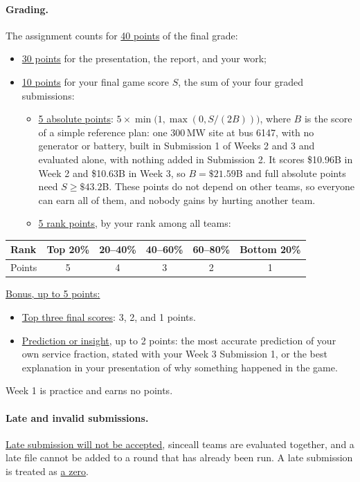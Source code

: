 \documentclass[10pt]{article}
\newcommand{\alert}[1]{{\color{alertblue}\uline{#1}}}
\newcommand{\MW}{\ensuremath{\,\mathrm{MW}}}
\begin{document}
\paragraph{Grading.} The assignment counts for \alert{40 points} of the final
grade:
\begin{itemize}[leftmargin=*]
  \item \alert{30 points} for the presentation, the report, and your work;
  \item \alert{10 points} for your final game score $S$, the sum of your four
    graded submissions:
    \begin{itemize}
      \item \alert{5 absolute points}: $5 \times \min\!\big(1, \max(0, S/(2B))\big)$,
        where $B$ is the score of a simple reference plan: one 300\MW{} site
        at bus 6147, with no generator or battery, built in Submission 1 of
        Weeks 2 and 3 and evaluated alone, with nothing added in Submission 2.
        It scores \$10.96B in Week 2 and \$10.63B in Week 3, so
        $B = \$21.59$B and full absolute points need $S \ge \$43.2$B.
        These points do not depend on other teams, so everyone can earn all
        of them, and nobody gains by hurting another team.
      \item \alert{5 rank points}, by your rank among all teams:
    \end{itemize}
\end{itemize}
\begin{center}
\small
\begin{tabular}{@{}lccccc@{}}
\toprule
Rank & Top 20\% & 20--40\% & 40--60\% & 60--80\% & Bottom 20\%\\
\midrule
Points & 5 & 4 & 3 & 2 & 1\\
\bottomrule
\end{tabular}
\end{center}
\alert{Bonus, up to 5 points:}
\begin{itemize}[leftmargin=*]
  \item \alert{Top three final scores}: 3, 2, and 1 points.
  \item \alert{Prediction or insight}, up to 2 points: the most accurate
    prediction of your own service fraction, stated with your Week 3
    Submission 1, or the best explanation in your presentation of why something
    happened in the game.
\end{itemize}
Week 1 is practice and earns no points.

\paragraph{Late and invalid submissions.} \alert{Late submission will not be accepted}, sinceall teams are evaluated together, and a late file cannot be added to a round that has
already been run. A late submission is treated as \alert{a zero}.
\end{document}
